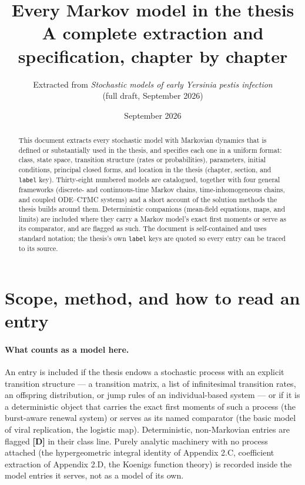 \documentclass[11pt,a4paper]{article}
\title{Every Markov model in the thesis\\[4pt]
\large A complete extraction and specification, chapter by chapter}
\author{Extracted from \textit{Stochastic models of early \textit{Yersinia pestis} infection}\\
(full draft, September 2026)}
\date{September 2026}
\begin{document}
\maketitle

\begin{abstract}
\noindent This document extracts every stochastic model with Markovian
dynamics that is defined or substantially used in the thesis, and specifies
each one in a uniform format: class, state space, transition structure
(rates or probabilities), parameters, initial conditions, principal closed
forms, and location in the thesis (chapter, section, and \texttt{label}
key). Thirty-eight numbered models are catalogued, together with four
general frameworks (discrete- and continuous-time Markov chains,
time-inhomogeneous chains, and coupled ODE--CTMC systems) and a short
account of the solution methods the thesis builds around them. Deterministic
companions (mean-field equations, maps, and limits) are included where they
carry a Markov model's exact first moments or serve as its comparator, and
are flagged as such. The document is self-contained and uses standard
notation; the thesis's own \texttt{label} keys are quoted so every entry can
be traced to its source.
\end{abstract}

\tableofcontents

\section{Scope, method, and how to read an entry}
\label{sec:scope}

\paragraph{What counts as a model here.} An entry is included if the thesis
endows a stochastic process with an explicit transition structure --- a
transition matrix, a list of infinitesimal transition rates, an offspring
distribution, or jump rules of an individual-based system --- or if it is a
deterministic object that carries the exact first moments of such a process
(the burst-aware renewal system) or serves as its named comparator (the
basic model of viral replication, the logistic map). Deterministic,
non-Markovian entries are flagged \textbf{[D]} in their class line. Purely
analytic machinery with no process attached (the hypergeometric integral
identity of Appendix 2.C, coefficient extraction of Appendix 2.D, the
Koenigs function theory) is recorded inside the model entries it serves,
not as a model of its own.
\end{document}
